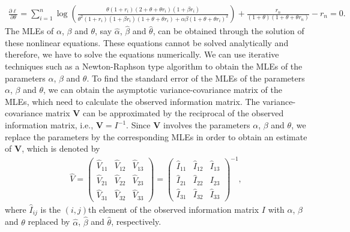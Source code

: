 \documentclass[twoside]{article}
\begin{document}
\vskip -7mm
\begin{eqnarray}  \label{8}
\frac{{\partial \ell }}{{\partial \theta }} = \sum\limits_{i = 1}^n {\log } \left( {\frac{{\theta (1 + {r_i})(2 + \theta  + \theta {r_i})(1 + \beta {r_i})}}{{{\theta ^2}(1 + {r_i})(1 + \beta {r_i})(1 + \theta  + \theta {r_i}) + \alpha \beta {{(1 + \theta  + \theta {r_i})}^2}}}} \right) + \frac{{{r_n}}}{{(1 + \theta )(1 + \theta  + \theta {r_n})}} - {r_n} = 0.
\end{eqnarray}
The MLEs of $\alpha$, $\beta$ and $\theta$, say $\hat \alpha$, $\hat \beta$ and $\hat \theta$, can be obtained through the solution of these nonlinear equations. These equations cannot be solved analytically and therefore, we have to solve the equations numerically. We can use iterative techniques such as a Newton-Raphson type algorithm to obtain the MLEs of the parameters $\alpha$, $\beta$ and $\theta$. To find the standard error of the MLEs of the parameters $\alpha$, $\beta$ and $\theta$, we can obtain the asymptotic variance-covariance matrix of the MLEs, which need to calculate the observed information matrix. The variance-covariance matrix $\textbf{V}$ can be approximated by the reciprocal of the observed information matrix, i.e., $\textbf{V} = {I^{ - 1}}$. Since $\textbf{V}$ involves the parameters $\alpha$, $\beta$ and $\theta$, we replace the parameters by the corresponding MLEs in order to obtain an estimate of $\textbf{V}$, which is denoted by
\begin{eqnarray} \label{8}
\hat V = \left( {\begin{array}{*{20}{c}}
{{{\hat V}_{11}}}&{{{\hat V}_{12}}}&{{{\hat V}_{13}}}\\
{{{\hat V}_{21}}}&{{{\hat V}_{22}}}&{{{\hat V}_{23}}}\\
{{{\hat V}_{31}}}&{{{\hat V}_{32}}}&{{{\hat V}_{33}}}
\end{array}} \right) = {\left( {\begin{array}{*{20}{c}}
{{{\hat I}_{11}}}&{{{\hat I}_{12}}}&{{{\hat I}_{13}}}\\
{{{\hat I}_{21}}}&{{{\hat I}_{22}}}&{{I_{23}}}\\
{{{\hat I}_{31}}}&{{{\hat I}_{32}}}&{{{\hat I}_{33}}}
\end{array}} \right)^{ - 1}},
\end{eqnarray}
where ${{\hat I}_{ij}}$ is the $(i,j)$th element of the observed information matrix $I$ with $\alpha$, $\beta$ and $\theta$ replaced by $\hat \alpha$, $\hat \beta$ and $\hat \theta$, respectively. 
\end{document}
